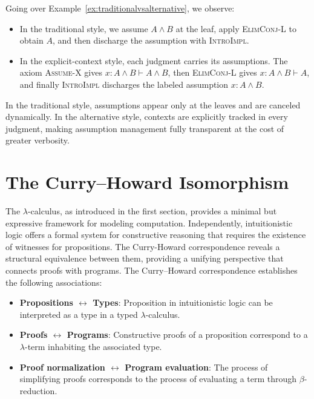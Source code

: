 \begin{note} Going over Example~\ref{ex:traditionalvsalternative}, we observe:
\begin{itemize}
  \item In the traditional style, we assume $A \land B$ at the leaf, apply \textsc{ElimConj-L} to obtain $A$, and then discharge the assumption with \textsc{IntroImpl}.
  \item In the explicit-context style, each judgment carries its assumptions. The axiom \textsc{Assume-X} gives $x:A \land B \vdash A \land B$, then \textsc{ElimConj-L} gives $x:A \land B \vdash A$, and finally \textsc{IntroImpl} discharges the labeled assumption $x:A \land B$.
\end{itemize}
\end{note}
  
\begin{note}
In the traditional style, assumptions appear only at the leaves and are canceled 
dynamically. In the alternative style, contexts are explicitly tracked in every 
judgment, making assumption management fully transparent at the cost of greater 
verbosity.
\end{note}
\section{\centering The Curry--Howard Isomorphism}
The $\lambda$-calculus, as introduced in the first section, provides a minimal but expressive framework for modeling computation. Independently, intuitionistic logic offers a formal system for constructive reasoning that requires the existence of witnesses for propositions. The Curry-Howard correspondence reveals a structural equivalence between them, providing a unifying perspective that connects proofs with programs. The Curry--Howard correspondence establishes the following associations:
\begin{itemize}
\item \textbf{Propositions $\leftrightarrow$ Types}: Proposition in intuitionistic logic can be interpreted as a type in a typed $\lambda$-calculus.
\item \textbf{Proofs $\leftrightarrow$ Programs}: Constructive proofs of a proposition correspond to a $\lambda$-term inhabiting the associated type.
\item \textbf{Proof normalization $\leftrightarrow$ Program evaluation}: The process of simplifying proofs  corresponds to the process of evaluating a term through $\beta$-reduction.
\end{itemize}
